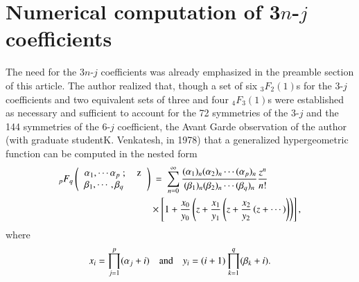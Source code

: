 \section*{Numerical computation of 3$n$-$j$ coefficients}

The need for the 3$n$-$j$ coefficients was already emphasized in the preamble section of this article. The author realized that, though a set of six $_3F_2(1)$s for the 3-$j$ coefficients and two equivalent sets of three and four $_4F_3(1)$s were established as necessary and sufficient to account for the 72 symmetries of the 3-$j$ and the 144 symmetries of the 6-$j$ coefficient, the Avant Garde observation of the author (with graduate student\break K. Venkatesh, in 1978) that a generalized hypergeometric function can be computed in the nested form
\begin{equation}
\begin{split}
{}_pF_q
\left( 
\begin{tabular}{lr} 
$\alpha_1,\cdots \alpha_p\ ;$ & z\\
$\beta_1,\cdots, \beta_q $& \\ 
\end{tabular} 
\right) & \ =\ \sum_{n=0}^\infty 
\frac{(\alpha_1)_n (\alpha_2)_n \cdots (\alpha_p)_n}{(\beta_1)_n (\beta_2)_n \cdots (\beta_q)_n}
\frac{z^n}{n!}\\
& \times \left[ 1 + \frac{x_0}{y_0}\left(z + \frac{x_1}{y_1}\left( z + \frac{x_2}{y_2}\left(z + \cdots 
\right) \right) \right) \right], \label{chap7-eq59}
\end{split}
\end{equation}
where
\begin{equation}
x_i=\prod_{j=1}^p (\alpha_j + i)\quad {\rm and}\quad y_i= (i+1)\prod_{k=1}^q (\beta_k + i).\label{chap7-eq60}
\end{equation}

